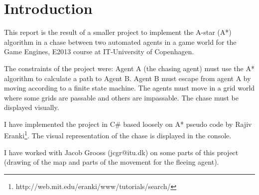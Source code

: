 \section{Introduction}
\label{Intro}
This report is the result of a smaller project to implement the A-star (A*) algorithm in a chase between two automated agents in a game world for the Game Engines, E2013 course at IT-University of Copenhagen.

The constraints of the project were: Agent A (the chasing agent) must use the A* algorithm to calculate a path to Agent B. Agent B must escape from agent A by moving according to a finite state machine. The agents must move in a grid world where some grids are passable and others are impassable. The chase must be displayed visually.

I have implemented the project in C\# based loosely on A* pseudo code by Rajiv Eranki\footnote{http://web.mit.edu/eranki/www/tutorials/search/}. The visual representation of the chase is displayed in the console.

I have worked with Jacob Grooss (jcgr@itu.dk) on some parts of this project (drawing of the map and parts of the movement for the fleeing agent).